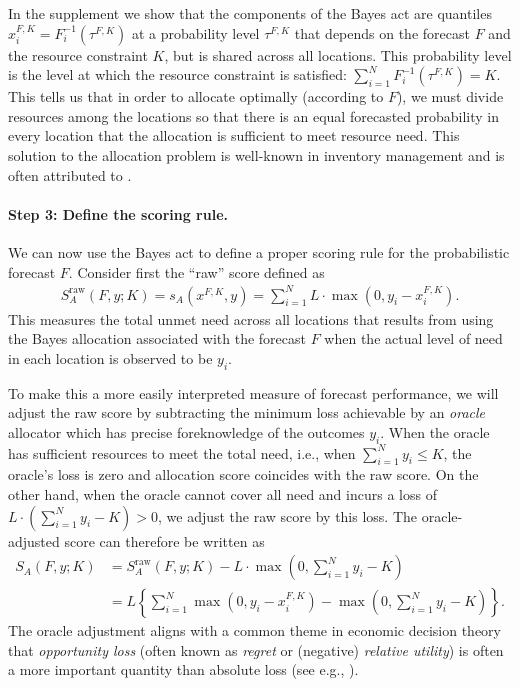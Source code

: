 \documentclass{article}\usepackage[]{graphicx}\usepackage[]{xcolor}
\begin{document}
In the supplement we show that the components of the Bayes act are quantiles $x_i^{F,K} = F_i^{-1}(\tau^{F,K})$ at a
probability level $\tau^{F,K}$ that depends on the forecast $F$ and the resource constraint $K$, but is shared across
all locations. This probability level is the level at which the resource constraint is satisfied: $\sum_{i=1}^N
F_i^{-1}(\tau^{F,K}) = K$. This tells us that in order to allocate optimally (according to $F$), we must divide
resources among the locations so that there is an equal forecasted probability in every location that the allocation is
sufficient to meet resource need. This solution to the allocation problem is well-known in inventory management and is
often attributed to \cite{hadleywhitin1963}.

\paragraph{Step 3: Define the scoring rule.} We can now use the Bayes act to define a proper scoring rule for the
probabilistic forecast $F$. Consider first the ``raw'' score defined as
\begin{align}
  S_A^{\text{raw}}(F, y; K) = s_A(x^{F,K}, y) = \sum_{i=1}^N L \cdot \max(0, y_i - x_i^{F,K}).
\end{align}
This measures the total unmet need across all locations that results from using the Bayes allocation associated with the
forecast $F$ when the actual level of need in each location is observed to be $y_i$.

To make this a more easily interpreted measure of forecast performance, we will adjust the raw score by subtracting the
minimum loss achievable by an \emph{oracle} allocator which has precise foreknowledge of the outcomes $y_i$. When the
oracle has sufficient resources to meet the total need, i.e., when $\sum_{i=1}^{N}y_i \leq K$, the oracle's loss is zero
and allocation score coincides with the raw score. On the other hand, when the oracle cannot cover all need and incurs a
loss of $L \cdot \left(\sum_{i=1}^{N}y_i - K \right) > 0$, we adjust the raw score by this loss.
The oracle-adjusted score can therefore be written as
\begin{align}
  S_A(F, y; K)  &= S_A^{\text{raw}}(F, y; K) - L \cdot \max\left(0,\sum_{i=1}^{N}y_i - K\right) \\
  &= L\left\{\sum_{i=1}^N \max(0, y_i - x_i^{F,K}) -  \max\left(0,\sum_{i=1}^{N}y_i - K\right)\right\}.
\end{align}
The oracle adjustment aligns with a common theme in economic decision theory that \emph{opportunity loss} (often known
as \emph{regret} or (negative) \emph{relative utility}) is often a more important quantity than absolute loss (see e.g.,
\cite{DIECIDUE201788}).
\end{document}
